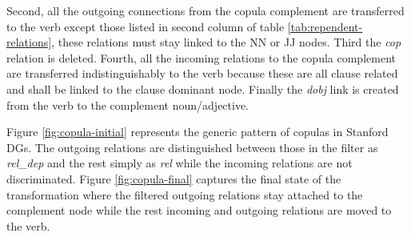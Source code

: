 Second, all the outgoing connections from the copula complement are transferred to the verb except those listed in second column of table \ref{tab:rependent-relations}, these relations must stay linked to the NN or JJ nodes. Third the \textit{cop} relation is deleted. Fourth, all the incoming relations to the copula complement are transferred indistinguishably to the verb because these are all clause related and shall be linked to the clause dominant node. Finally the \textit{dobj} link is created from the verb to the complement noun/adjective.

Figure \ref{fig:copula-initial} represents the generic pattern of copulas in Stanford DGs. The outgoing relations are distinguished between those in the filter as \textit{rel\_dep} and the rest simply as \textit{rel} while the incoming relations are not discriminated. Figure \ref{fig:copula-final} captures the final state of the transformation where the filtered outgoing relations stay attached to the complement node while the rest incoming and outgoing relations are moved to the verb.  

